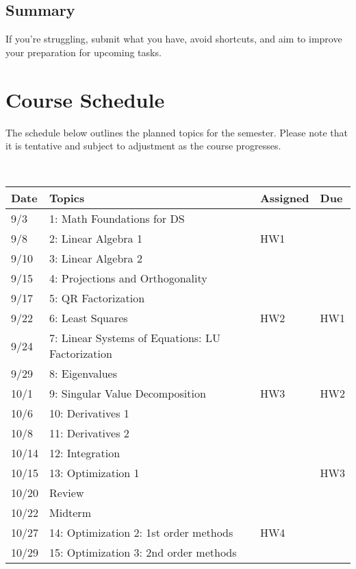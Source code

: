 \documentclass[11pt]{article}
\begin{document}
\subsection*{Summary}

If you're struggling, submit what you have, avoid shortcuts, and aim to improve your preparation for upcoming tasks.

\section*{Course Schedule}

The schedule below outlines the planned topics for the semester. Please note that it is tentative and subject to adjustment as the course progresses.

~\\
\small
\begin{centering}
\begin{tabular}{||l|p{3in}|l|l||}
\hline\hline
Date & Topics  & Assigned & Due  \\
\hline\hline
9/3 & 1: Math Foundations for DS &   & \\
\hline
9/8 & 2: Linear Algebra 1 & HW1   & \\
9/10& 3: Linear Algebra 2 &   & \\
\hline
9/15 &  4: Projections and Orthogonality  &  &  \\
9/17& 5: QR Factorization &  &   \\
\hline
9/22& 6: Least Squares   & HW2    &HW1   \\
9/24 & 7: Linear Systems of Equations: LU Factorization   &  & \\
\hline
9/29 & 8: Eigenvalues  &  &   \\ 
10/1 & 9: Singular Value Decomposition & HW3 & HW2  \\
\hline
10/6 & 10: Derivatives 1 &  &  \\
10/8& 11: Derivatives 2  &   &   \\  
\hline 
10/14& 12: Integration &  &    \\
10/15 & 13: Optimization 1  & &HW3\\
\hline
10/20 & Review    &  &\\
10/22 &  Midterm &  &  \\ 
\hline
  
10/27 & 14: Optimization 2: 1st order methods  &HW4 &  \\  
10/29& 15:  Optimization 3: 2nd order methods & & \\
\hline


\end{tabular}
\end{centering}
\end{document}

